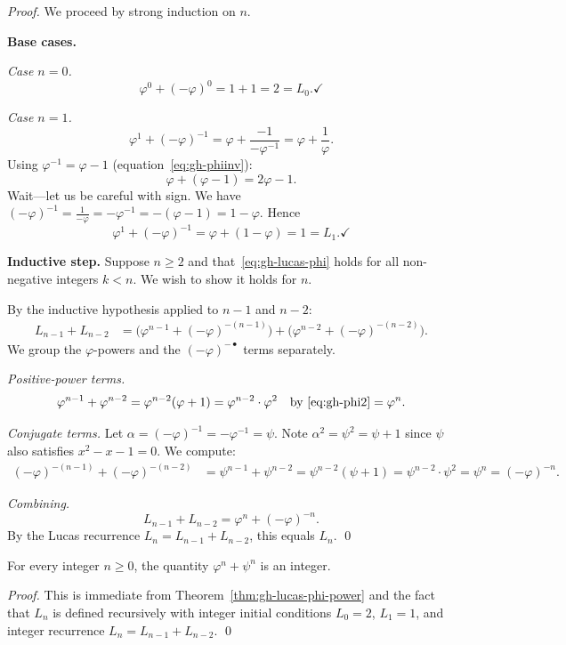 \begin{proof}
We proceed by strong induction on \(n\).

\medskip
\noindent\textbf{Base cases.}

\emph{Case \(n = 0\).}
\[
  \varphi^0 + (-\varphi)^{0} = 1 + 1 = 2 = L_0. \checkmark
\]

\emph{Case \(n = 1\).}
\[
  \varphi^1 + (-\varphi)^{-1}
  = \varphi + \frac{-1}{-\varphi^{-1}}
  = \varphi + \frac{1}{\varphi}.
\]
Using \(\varphi^{-1} = \varphi - 1\) (equation~\eqref{eq:gh-phiinv}):
\[
  \varphi + (\varphi - 1) = 2\varphi - 1.
\]
Wait—let us be careful with sign.  We have
\((-\varphi)^{-1} = \frac{1}{-\varphi} = -\varphi^{-1} = -(\varphi-1) = 1-\varphi\).
Hence
\[
  \varphi^1 + (-\varphi)^{-1} = \varphi + (1 - \varphi) = 1 = L_1. \checkmark
\]

\medskip
\noindent\textbf{Inductive step.}
Suppose \(n \geq 2\) and that~\eqref{eq:gh-lucas-phi} holds for all
non-negative integers \(k < n\).  We wish to show it holds for \(n\).

By the inductive hypothesis applied to \(n-1\) and \(n-2\):
\begin{align*}
  L_{n-1} + L_{n-2}
  &= \bigl(\varphi^{n-1} + (-\varphi)^{-(n-1)}\bigr)
   + \bigl(\varphi^{n-2} + (-\varphi)^{-(n-2)}\bigr).
\end{align*}
We group the \(\varphi\)-powers and the \((-\varphi)^{-\bullet}\) terms
separately.

\emph{Positive-power terms.}
\[
  \varphi^{n-1} + \varphi^{n-2}
  = \varphi^{n-2}(\varphi + 1)
  = \varphi^{n-2} \cdot \varphi^2      \quad \text{by~\eqref{eq:gh-phi2}}
  = \varphi^n.
\]

\emph{Conjugate terms.}
Let \(\alpha = (-\varphi)^{-1} = -\varphi^{-1} = \psi\).  Note
\(\alpha^2 = \psi^2 = \psi + 1\) since \(\psi\) also satisfies
\(x^2 - x - 1 = 0\).  We compute:
\begin{align*}
  (-\varphi)^{-(n-1)} + (-\varphi)^{-(n-2)}
  &= \psi^{n-1} + \psi^{n-2}
   = \psi^{n-2}(\psi + 1)
   = \psi^{n-2} \cdot \psi^2
   = \psi^n
   = (-\varphi)^{-n}.
\end{align*}

\emph{Combining.}
\[
  L_{n-1} + L_{n-2}
  = \varphi^n + (-\varphi)^{-n}.
\]
By the Lucas recurrence \(L_n = L_{n-1} + L_{n-2}\), this equals \(L_n\).
\qed
\end{proof}

\begin{corollary}
\label{cor:gh-integer}
For every integer \(n \geq 0\), the quantity
\(\varphi^n + \psi^n\) is an integer.
\end{corollary}
\begin{proof}
This is immediate from Theorem~\ref{thm:gh-lucas-phi-power} and the
fact that \(L_n\) is defined recursively with integer initial conditions
\(L_0 = 2\), \(L_1 = 1\), and integer recurrence
\(L_n = L_{n-1} + L_{n-2}\).
\qed
\end{proof}

